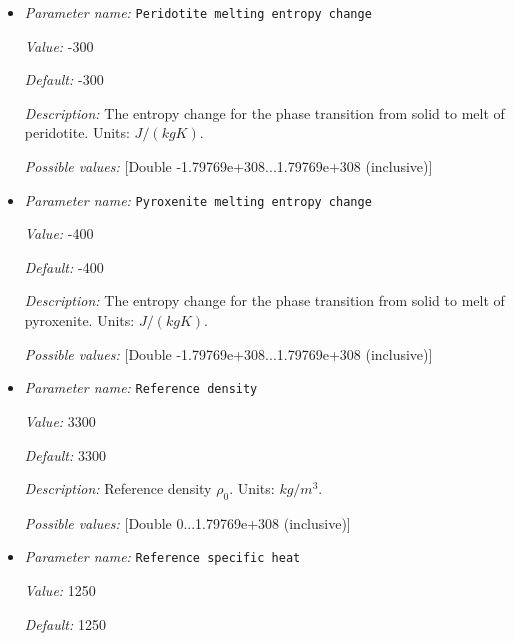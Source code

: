 \begin{itemize}
{\it Possible values:} [Double -1.79769e+308...1.79769e+308 (inclusive)]
\item {\it Parameter name:} {\tt Peridotite melting entropy change}
\label{parameters:Material model/Latent heat melt/Peridotite melting entropy change}


{\it Value:} -300


{\it Default:} -300


{\it Description:} The entropy change for the phase transition from solid to melt of peridotite. Units: $J/(kg K)$.


{\it Possible values:} [Double -1.79769e+308...1.79769e+308 (inclusive)]
\item {\it Parameter name:} {\tt Pyroxenite melting entropy change}
\label{parameters:Material model/Latent heat melt/Pyroxenite melting entropy change}


{\it Value:} -400


{\it Default:} -400


{\it Description:} The entropy change for the phase transition from solid to melt of pyroxenite. Units: $J/(kg K)$.


{\it Possible values:} [Double -1.79769e+308...1.79769e+308 (inclusive)]
\item {\it Parameter name:} {\tt Reference density}
\label{parameters:Material model/Latent heat melt/Reference density}


{\it Value:} 3300


{\it Default:} 3300


{\it Description:} Reference density $\rho_0$. Units: $kg/m^3$.


{\it Possible values:} [Double 0...1.79769e+308 (inclusive)]
\item {\it Parameter name:} {\tt Reference specific heat}
\label{parameters:Material model/Latent heat melt/Reference specific heat}


{\it Value:} 1250


{\it Default:} 1250



\end{itemize}
